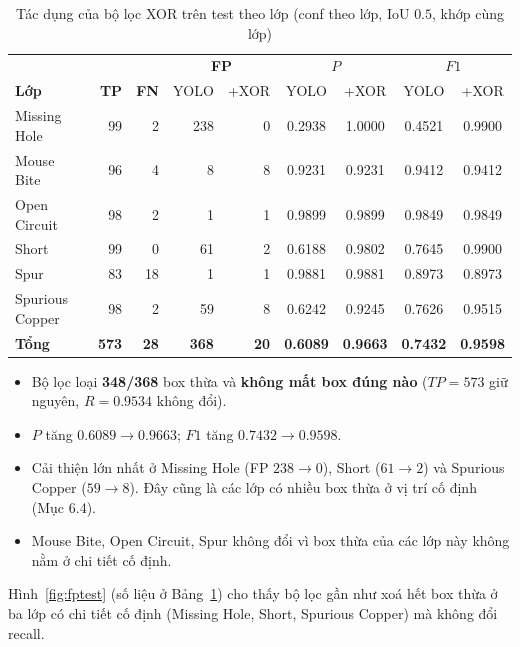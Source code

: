 \documentclass[11pt,a4paper]{article}
\newcommand{\hinhref}[1]{Hình~\ref{fig:#1}}
\newcommand{\bangref}[1]{Bảng~\ref{tab:#1}}
\begin{document}
\begin{table}[H]
\centering
\small
\caption{Tác dụng của bộ lọc XOR trên test theo lớp (conf theo lớp, IoU $0.5$, khớp cùng lớp)}\label{tab:loctest}
\begin{tabular}{l|rr|rr|cc|cc}
\toprule
 & & & \multicolumn{2}{c|}{\textbf{FP}} & \multicolumn{2}{c|}{$P$} & \multicolumn{2}{c}{$F1$} \\
\textbf{Lớp} & \textbf{TP} & \textbf{FN} & YOLO & +XOR & YOLO & +XOR & YOLO & +XOR \\ \midrule
Missing Hole & 99 & 2 & 238 & 0 & 0.2938 & 1.0000 & 0.4521 & 0.9900 \\
Mouse Bite & 96 & 4 & 8 & 8 & 0.9231 & 0.9231 & 0.9412 & 0.9412 \\
Open Circuit & 98 & 2 & 1 & 1 & 0.9899 & 0.9899 & 0.9849 & 0.9849 \\
Short & 99 & 0 & 61 & 2 & 0.6188 & 0.9802 & 0.7645 & 0.9900 \\
Spur & 83 & 18 & 1 & 1 & 0.9881 & 0.9881 & 0.8973 & 0.8973 \\
Spurious Copper & 98 & 2 & 59 & 8 & 0.6242 & 0.9245 & 0.7626 & 0.9515 \\ \midrule
\textbf{Tổng} & \textbf{573} & \textbf{28} & \textbf{368} & \textbf{20} & \textbf{0.6089} & \textbf{0.9663} & \textbf{0.7432} & \textbf{0.9598} \\ \bottomrule
\end{tabular}
\end{table}

\begin{itemize}
  \item Bộ lọc loại \textbf{348/368} box thừa và \textbf{không mất box đúng nào} ($TP=573$ giữ nguyên, $R=0.9534$ không đổi).
  \item $P$ tăng $0.6089 \to 0.9663$; $F1$ tăng $0.7432 \to 0.9598$.
  \item Cải thiện lớn nhất ở Missing Hole (FP $238 \to 0$), Short ($61 \to 2$) và Spurious Copper ($59 \to 8$). Đây cũng là các lớp có nhiều box thừa ở vị trí cố định (Mục 6.4).
  \item Mouse Bite, Open Circuit, Spur không đổi vì box thừa của các lớp này không nằm ở chi tiết cố định.
\end{itemize}

\hinhref{fptest} (số liệu ở \bangref{loctest}) cho thấy bộ lọc gần như xoá hết box thừa ở ba lớp có chi tiết cố định (Missing Hole, Short, Spurious Copper) mà không đổi recall.
\end{document}

